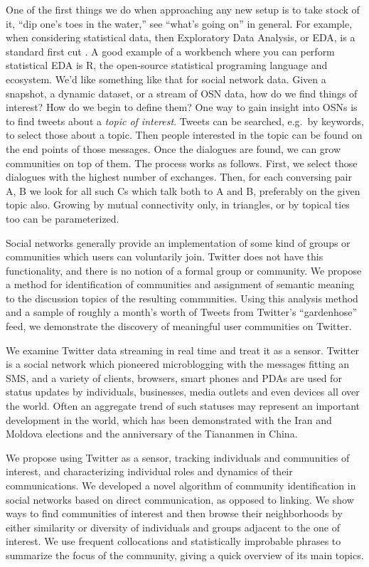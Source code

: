 \documentclass[10pt,oneside]{memoir}
\begin{document}
\begin{Spacing}{2}
One of the first things we do when approaching any new setup is to take stock of it, ``dip one's toes in the water,'' see ``what's going on'' in general.  For example, when considering statistical data, then Exploratory Data Analysis, or EDA, is a standard first cut \cite{Tukey:1977:EDA}.  A good example of a workbench where you can perform statistical EDA is R, the open-source statistical programing language and ecosystem.
We'd like something like that for social network data.  Given a snapshot, a dynamic dataset, or a stream of OSN data, how do we find things of interest?  How do we begin to define them?
One way to gain insight into OSNs is to find tweets about a {\itshape topic of interest}.  Tweets can be searched, e.g.\ by keywords, to select those about a topic.  Then people interested in the topic can be found on the end points of those messages.
Once the dialogues are found, we can grow communities on top of them.  The process works as follows.
First, we select those dialogues with the highest number of exchanges.  Then, for each conversing pair {A, B} we look for all such Cs which talk both to A and B, preferably on the given topic also.  Growing by mutual connectivity only, in triangles, or by topical ties too can be parameterized.


Social networks generally provide an implementation of some kind of groups or communities which users can voluntarily join.  Twitter does not have this functionality, and there is no notion of a formal group or community.  We propose a method for identification of communities and assignment of semantic meaning to the discussion topics of the resulting communities.  Using this analysis method and a sample of roughly a month's worth of Tweets from Twitter's ``gardenhose'' feed, we demonstrate the discovery of meaningful user communities on Twitter.


We examine Twitter data streaming in real time and treat it as a sensor.  Twitter is a social network which pioneered microblogging with the messages fitting an SMS, and a variety of clients, browsers, smart phones and PDAs are used for status updates by individuals, businesses, media outlets and even devices all over the world.  Often an aggregate trend of such statuses may represent an important development in the world, which has been demonstrated with the Iran and Moldova elections and the anniversary of the Tiananmen in China.


We propose using Twitter as a sensor, tracking individuals and communities of interest, and characterizing individual roles and dynamics of their communications.  We developed a novel algorithm of community identification in social networks based on direct communication, as opposed to linking.  We show ways to find communities of interest and then browse their neighborhoods by either similarity or diversity of individuals and groups adjacent to the one of interest.  We use frequent collocations and statistically improbable phrases to summarize the focus of the community, giving a quick overview of its main topics.  



\end{Spacing}
\end{document}

